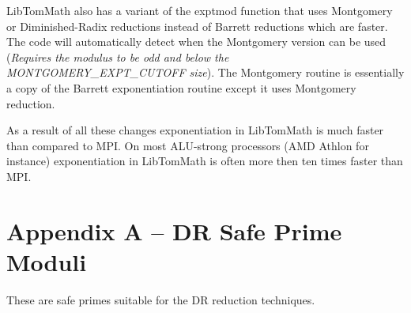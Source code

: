 \documentclass[]{article}
\begin{document}
LibTomMath also has a variant of the exptmod function that uses Montgomery or Diminished-Radix reductions instead of 
Barrett reductions which are faster.  The code will automatically detect when the Montgomery version can be used 
(\textit{Requires the modulus to be odd and below the MONTGOMERY\_EXPT\_CUTOFF size}).  The Montgomery routine is 
essentially a copy of the Barrett exponentiation routine except it uses Montgomery reduction.

As a result of all these changes exponentiation in LibTomMath is much faster than compared to MPI.  On most ALU-strong
processors (AMD Athlon for instance) exponentiation in LibTomMath is often more then ten times faster than MPI.

\newpage
\section*{Appendix A -- DR Safe Prime Moduli}
These are safe primes suitable for the DR reduction techniques.
\end{document}
